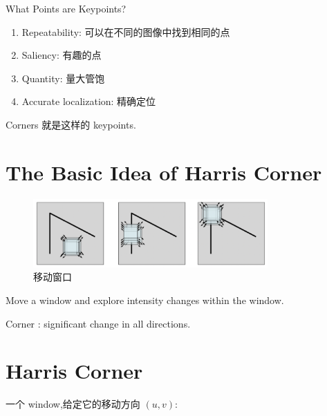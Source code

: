 \documentclass[lang=cn,10pt,green]{elegantbook}
\begin{document}
\begin{problem}
    What Points are Keypoints?
\end{problem}

\begin{enumerate}
    \item Repeatability: 可以在不同的图像中找到相同的点
    \item Saliency: 有趣的点
    \item Quantity: 量大管饱
    \item Accurate localization: 精确定位
\end{enumerate}
Corners 就是这样的 keypoints.




\section{The Basic Idea of Harris Corner}

\begin{figure}[htbp]
    \centering
    \includegraphics[width=0.8\textwidth]{figures/window_moving.png}
    \caption{移动窗口}    
\end{figure}

Move a window and explore intensity changes within the window.

Corner : significant change in all directions.

\section{Harris Corner}

一个 window,给定它的移动方向 $(u,v)$:
\end{document}
